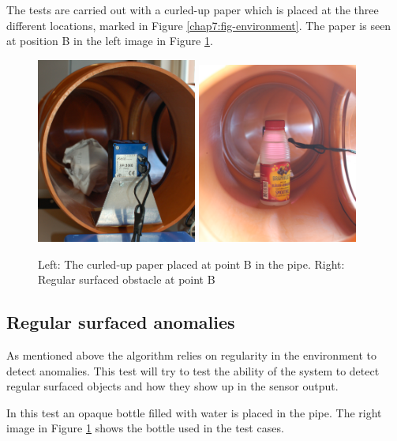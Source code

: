 The tests are carried out with a curled-up paper which is placed at the three different
locations, marked in Figure \ref{chap7:fig-environment}. The paper is seen at position B
in the left image in Figure \ref{chap7:fig-pics-of-obstacles}.
\begin{figure}[htbp]
    \centering
    \includegraphics[width=0.47\textwidth]{pics/irregularSR}
    \includegraphics[width=0.47\textwidth]{pics/pos2-regular-tof}
    \caption{Left: The curled-up paper placed at point B in the pipe. Right: Regular
    surfaced obstacle at point B}
    \label{chap7:fig-pics-of-obstacles}
\end{figure}

\subsection{Regular surfaced anomalies}
As mentioned above the algorithm relies on regularity in the environment to detect
anomalies. This test will try to test the ability of the system to detect regular surfaced
objects and how they show up in the sensor output.

In this test an opaque bottle filled with water is placed in the pipe. The right image in Figure
\ref{chap7:fig-pics-of-obstacles} shows the bottle used in the test cases.

